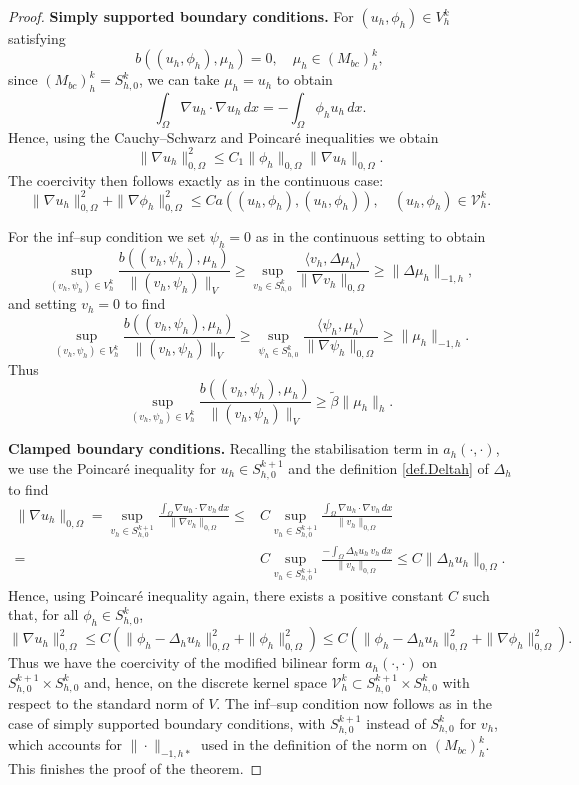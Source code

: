 \documentclass[a4paper,final]{siamltex}
\newcommand{\CV}{\mathcal{V}}
\newcommand{\Mb}{{(M_{bc})}}
\begin{document}
\begin{proof}
{\bf Simply supported boundary conditions.}
For $(u_h, \phi_h) \in V^k_h $ satisfying 
\[
b((u_h,\phi_h),\mu_h) = 0, \quad \mu_h \in \Mb^k_h,
\]
since $\Mb^k_h=S_{h,0}^k$, we can take $\mu_h=u_h$ to obtain
\[ \int_{\Omega} \nabla u_h \cdot \nabla u_h \,dx = - \int_{\Omega} \phi_h u_h\,dx.\]
Hence, using the Cauchy--Schwarz and Poincar\'e inequalities we obtain 
\[ \|\nabla u_h \|^2_{0,\Omega}  \leq C_1 \|\phi_h\|_{0,\Omega} \|\nabla u_h\|_{0,\Omega}.\]
The coercivity then follows exactly as in the continuous case:
\[ \|\nabla u_h \|^2_{0,\Omega}+  \|\nabla\phi_h\|^2_{0,\Omega}
\leq  C a((u_h,\phi_h),(u_h,\phi_h)),\quad 
(u_h,\phi_h) \in \CV^k_h.
\]

For the inf--sup condition we set $\psi_h =0$  as in the continuous setting to obtain 
\[  \sup_{(v_h, \psi_h)  \in V^k_h} \frac{b((v_h,\psi_h),\mu_h)} 
{ \|(v_h,\psi_h)\|_{V} } {\ge}\sup_{v_h\in S^k_{h,0}}
\frac{ \langle v_h,\Delta \mu_h\rangle} 
{ \|\nabla v_h\|_{0,\Omega} } \geq \|\Delta \mu_h\|_{-1,h},\]
and setting $v_h=0$ to find 
\[  \sup_{(v_h, \psi_h)  \in V^k_h} \frac{b((v_h,\psi_h),\mu_h)} 
{ \|(v_h,\psi_h)\|_{V} }  {\ge}\sup_{ \psi_h  \in S^k_{h,0}} 
\frac{\langle\psi_h, \mu_h \rangle } { \|\nabla \psi_h\|_{0,\Omega} } \geq \|\mu_h\|_{-1,h}. \]
Thus \[  \sup_{(v_h, \psi_h)  \in V^k_h} \frac{b((v_h,\psi_h),\mu_h)} 
{ \|(v_h,\psi_h)\|_{V} } 
\geq  \tilde  \beta \|\mu_h\|_{h}.\]

{\bf Clamped boundary conditions.}
Recalling the stabilisation term in $a_h(\cdot,\cdot)$, we use the Poincar\'e inequality for $u_h \in S^{k+1}_{h,0}$
and the definition \eqref{def.Deltah} of $\Delta_h$ to find
\begin{align*}
	\|\nabla u_h \|_{0,\Omega}  = \sup_{v_h \in S^{k+1}_{h,0}} \frac{\int_{\Omega} \nabla u_h \cdot \nabla v_h\, dx}
{\|\nabla v_h\|_{0,\Omega}} \leq{}&  C \sup_{v_h \in S^{k+1}_{h,0}} \frac{\int_{\Omega} \nabla u_h \cdot \nabla v_h\, dx}
{\| v_h\|_{0,\Omega}}\\
={}&C \sup_{v_h \in S^{k+1}_{h,0}} \frac{-\int_{\Omega} \Delta_h u_h\, v_h\, dx}
{\| v_h\|_{0,\Omega}} \leq  C\|\Delta_h u_h\|_{0,\Omega}.
\end{align*}
Hence, using Poincar\'e inequality again, there exists a positive constant $C$ such that,
for all $\phi_h \in S_{h,0}^k$,
\[
\|\nabla u_h \|^2_{0,\Omega}  \leq C \left(\|\phi_h - \Delta_h u_h\|^2_{0,\Omega} + \|\phi_h\|^2_{0,\Omega}\right)
\leq  C \left(\|\phi_h - \Delta_h u_h\|^2_{0,\Omega} + \|\nabla \phi_h\|^2_{0,\Omega}\right).
\]
Thus we have the coercivity of the modified bilinear form $a_h(\cdot,\cdot)$ on $S_{h,0}^{k+1} \times S_{h,0}^k$ 
and, hence, on the discrete kernel space $\CV_h^k \subset S_{h,0}^{k+1} \times S_{h,0}^k$ 
with respect to the standard norm of $V$.
The inf--sup condition now follows as in the case of simply supported boundary
conditions, with $S_{h,0}^{k+1}$ instead of $S_{h,0}^k$ for $v_h$, which
accounts for $\|\cdot\|_{-1,h*}$ used in the definition of the norm on $\Mb_h^k$.
This finishes the proof of the theorem.
\end{proof}
\end{document}
